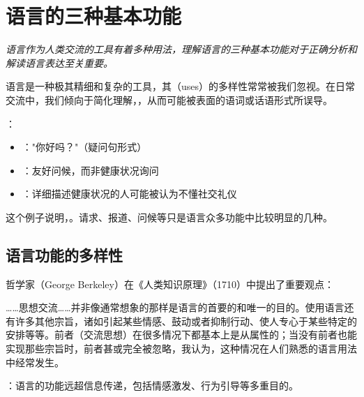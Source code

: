 \section{语言的三种基本功能}

\begin{logicbox}[title=引言]
\textit{语言作为人类交流的工具有着多种用法，理解语言的三种基本功能对于正确分析和解读语言表达至关重要。}
\end{logicbox}

语言是一种极其精细和复杂的工具，其（uses）的多样性常常被我们忽视。在日常交流中，我们倾向于简化理解，，从而可能被表面的语词或话语形式所误导。

\begin{examplebox}[title=语言功能的复杂性实例]
：
\begin{itemize}
  \item {}："你好吗？"（疑问句形式）
  \item {}：友好问候，而非健康状况询问
  \item {}：详细描述健康状况的人可能被认为不懂社交礼仪
\end{itemize}
\end{examplebox}

这个例子说明，。请求、报道、问候等只是语言众多功能中比较明显的几种。

\subsection{语言功能的多样性}

\begin{theorembox}[title=贝克莱的语言功能观]
哲学家（George Berkeley）在《人类知识原理》（1710）中提出了重要观点：

\begin{displayquote}
……思想交流……并非像通常想象的那样是语言的首要的和唯一的目的。使用语言还有许多其他宗旨，诸如引起某些情感、鼓动或者抑制行动、使人专心于某些特定的安排等等。前者（交流思想）在很多情况下都基本上是从属性的；当没有前者也能实现那些宗旨时，前者甚或完全被忽略，我认为，这种情况在人们熟悉的语言用法中经常发生。
\end{displayquote}

：语言的功能远超信息传递，包括情感激发、行为引导等多重目的。
\end{theorembox}

